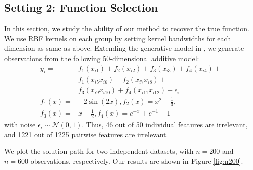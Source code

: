 
\subsection{Setting 2: Function Selection}

In this section, we study the ability of our method to recover the true function.
We use RBF kernels on each group by setting kernel bandwidths
for each dimension as same as above.
Extending the generative model in \cite{ravikumar09spam}, 
we generate observations from the following
50-dimensional additive model:
\begin{align*}
	y_i =& f_1(x_{i1}) + f_2(x_{i2}) + f_3(x_{i3}) + f_4(x_{i4}) + \\
&f_1(x_{i5}x_{i6}) + f_2(x_{i7}x_{i8}) + \\
&f_3(x_{i9}x_{i10}) + f_4(x_{i11}x_{i12}) + \epsilon_i \\
f_1(x) =& -2\sin(2x), f_2(x) = x^2 - \frac{1}{3}, \\
f_3(x)=& x-\frac{1}{2}, f_4(x) = e^{-x} + e^{-1} - 1
\end{align*}
with noise $\epsilon_i \sim \mathcal{N}(0,1)$.
Thus, 46 out of 50 individual features are irrelevant, and
1221 out of 1225 pairwise features are irrelevant.

We plot the solution path for two independent datasets, 
with $n=200$ and $n=600$ observations, respectively.
Our results are shown in Figure \ref{fig:n200}. 

